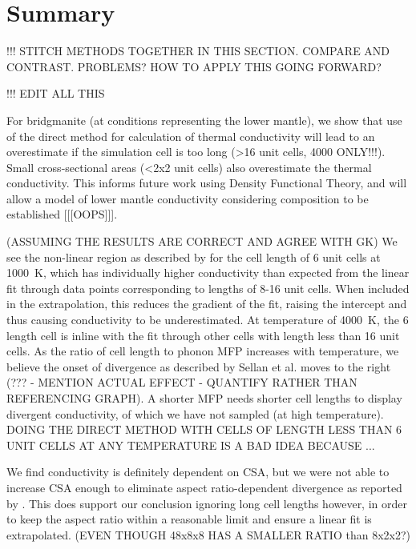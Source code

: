 \section{\label{sec:3.Summary}Summary}

!!! STITCH METHODS TOGETHER IN THIS SECTION. COMPARE AND CONTRAST. PROBLEMS? HOW TO APPLY THIS GOING FORWARD?

!!! EDIT ALL THIS

For bridgmanite (at conditions representing the lower mantle), we show that use of the direct method for calculation of thermal conductivity will lead to an overestimate if the simulation cell is too long (\textgreater 16 unit cells, 4000 ONLY!!!). Small cross-sectional areas (\textless 2x2 unit cells) also overestimate the thermal conductivity. This informs future work using Density Functional Theory, and will allow a model of lower mantle conductivity considering composition to be established [[[OOPS]]].

(ASSUMING THE RESULTS ARE CORRECT AND AGREE WITH GK) We see the non-linear region as described by \citet{Sellan2010} for the cell length of 6 unit cells at 1000~K, which has individually higher conductivity than expected from the linear fit through data points corresponding to lengths of 8-16 unit cells. When included in the extrapolation, this reduces the gradient of the fit, raising the intercept and thus causing conductivity to be underestimated. At temperature of 4000~K, the 6 length cell is inline with the fit through other cells with length less than 16 unit cells. As the ratio of cell length to phonon MFP increases with temperature, we believe the onset of divergence as described by Sellan et al. moves to the right (??? - MENTION ACTUAL EFFECT - QUANTIFY RATHER THAN REFERENCING GRAPH). A shorter MFP needs shorter cell lengths to display divergent conductivity, of which we have not sampled (at high temperature). DOING THE DIRECT METHOD WITH CELLS OF LENGTH LESS THAN 6 UNIT CELLS AT ANY TEMPERATURE IS A BAD IDEA BECAUSE ... 

We find conductivity is definitely dependent on CSA, but we were not able to increase CSA enough to eliminate aspect ratio-dependent divergence as reported by \citet{Hu2011}. This does support our conclusion ignoring long cell lengths however, in order to keep the aspect ratio within a reasonable limit and ensure a linear fit is extrapolated. (EVEN THOUGH 48x8x8 HAS A SMALLER RATIO than 8x2x2?)

